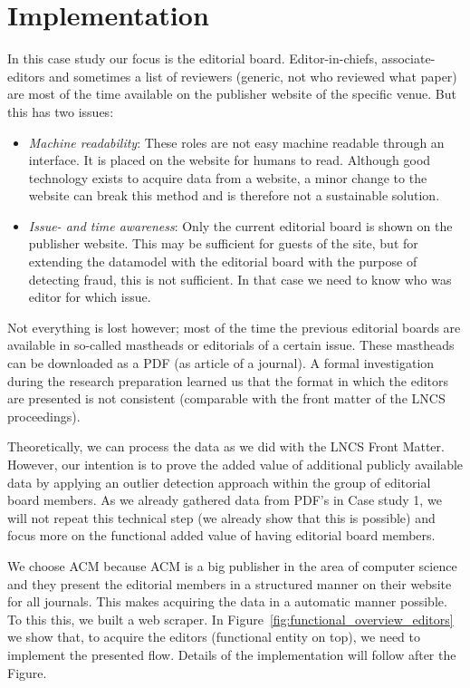 \documentclass{ou-report}
\newcommand{\lncs}{LNCS}
\begin{document}
\section{Implementation}
In this case study our focus is the editorial board. Editor-in-chiefs, 
associate-editors and sometimes a list of reviewers (generic, not who reviewed 
what paper) are most of the time available on the publisher website of the 
specific venue. But this has two issues:
\begin{itemize}
    \item \emph{Machine readability}: These roles are not easy machine readable 
    through an interface. It is placed on the website for humans to read. 
    Although good technology exists to acquire data from a website, a minor 
    change to 
    the website can break this method and is therefore not a sustainable
    solution.
    \item \emph{Issue- and time awareness}: Only the current editorial board is 
    shown on the publisher website. This may be sufficient for guests of the 
    site, but for extending the datamodel with the editorial board with the 
    purpose of detecting fraud, this is not sufficient. In that case we need 
    to know who was editor for which issue. 
\end{itemize}
Not everything is lost however; most of the time the previous editorial 
boards are available in so-called mastheads or editorials of a certain 
issue. These 
mastheads can be downloaded as a PDF (as article of a journal). A formal 
investigation during the research preparation learned us that the format in 
which the editors are presented is not consistent (comparable with the 
front matter of the \lncs{} proceedings).

Theoretically, we can process the data as we did with the \lncs{} Front 
Matter. However, our intention is to prove the added value of additional 
publicly available data
by applying an outlier detection approach within the group of editorial 
board members. As we already gathered data from PDF's in Case study 1, 
we will not repeat this technical step (we already show that this is 
possible) and focus more on the functional added value of having 
editorial board members.

We choose ACM because ACM is a big publisher in the area of computer science
and they present the editorial members in a structured manner on their 
website for all journals. This makes acquiring the data in a automatic 
manner possible. To this this, we built a web scraper. In
Figure~\ref{fig:functional_overview_editors} we show that, to acquire the
editors (functional entity on top), we need to implement the presented flow.
Details of the implementation will follow after the Figure.
\end{document}
